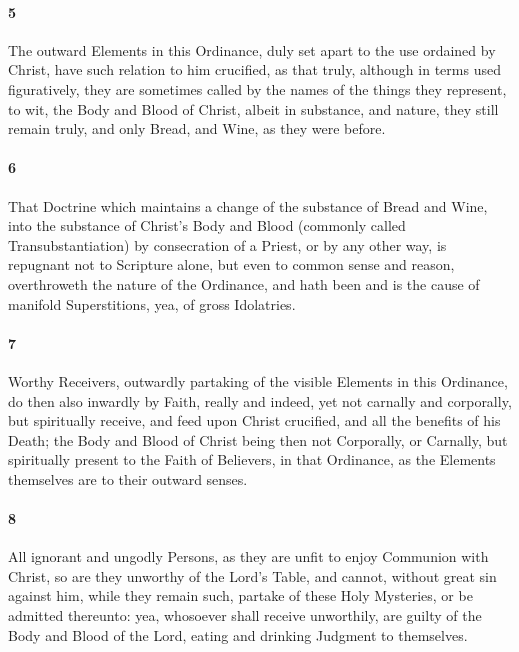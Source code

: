 \documentclass[
    paper=letterpaper,
    11pt,
    twoside,
    DIV=calc,
    openany
]{scrbook}
\begin{document}
\footnotebegin
{}
\footnoteend

\paragraph{5} %
The outward Elements in this Ordinance, duly set apart to the use ordained by Christ, have such relation to him crucified, as that truly, although in terms used figuratively, they are sometimes called by the names of the things they represent, to wit, the \R{}Body and Blood of Christ, albeit in substance, and nature, they still remain truly, and only \R{}Bread, and Wine, as they were before.

\footnotebegin
{}
\footnoteend

\paragraph{6} %
That Doctrine which maintains a change of the substance of Bread and Wine, into the substance of Christ’s Body and Blood (commonly called Transubstantiation) by consecration of a Priest, or by any other way, is repugnant not to Scripture \R{}alone, but even to common sense and reason, overthroweth the \R{}nature of the Ordinance, and hath been and is the cause of manifold Superstitions, yea, of gross Idolatries.

\footnotebegin
{}
\footnoteend

\paragraph{7} %
Worthy Receivers, outwardly partaking of the visible Elements in this Ordinance, do then also inwardly by Faith, really and indeed, yet not carnally and corporally, but spiritually receive, and feed upon Christ crucified, \R{}and all the benefits of his Death; the Body and Blood of Christ being then not Corporally, or Carnally, but spiritually present to the Faith of Believers, in that Ordinance, as the Elements themselves are to their outward senses.

\footnotebegin
{}
\footnoteend

\paragraph{8} %
All ignorant and ungodly Persons, as they are unfit to enjoy Communion \R{}with Christ, so are they unworthy of the Lord’s Table, and cannot, without great sin against him, while they remain such, partake of these Holy Mysteries, \R{}or be admitted thereunto: yea, whosoever shall receive unworthily, are guilty of the Body and Blood of the Lord, eating and drinking Judgment to themselves.
\end{document}
